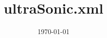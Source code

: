 \documentclass[11pt,a4paper]{article}
\begin{document}
\title{ultraSonic.xml}
\date{\today}
\maketitle


\end{document}
